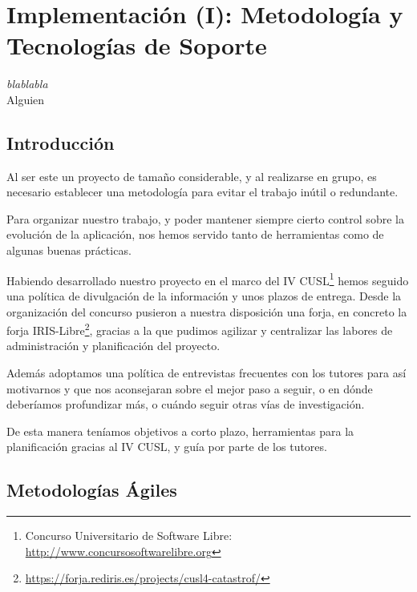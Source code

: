 \chapter*{Implementación (I): Metodología y Tecnologías de Soporte}
\label{cap5a}

\begin{flushright}
\begin{minipage}{7.85cm}
    {\em blablabla} \\  Alguien %
\end{minipage}
\end{flushright}

\vspace*{5mm}

\section*{Introducción}

Al ser este un proyecto de tamaño considerable, y al realizarse en grupo, es
necesario establecer una metodología para evitar el trabajo inútil o redundante.

Para organizar nuestro trabajo, y poder mantener siempre cierto control sobre la
evolución de la aplicación, nos hemos servido tanto de herramientas como de
algunas buenas prácticas.

Habiendo desarrollado nuestro proyecto en el marco del IV CUSL\footnote{Concurso
Universitario de Software Libre: \url{http://www.concursosoftwarelibre.org}}
hemos seguido una política de divulgación de la información y unos plazos de
entrega. Desde la organización del concurso pusieron a nuestra disposición una
forja, en concreto la forja
IRIS-Libre\footnote{\url{https://forja.rediris.es/projects/cusl4-catastrof/}},
gracias a la que pudimos agilizar y centralizar las labores de administración y
planificación del proyecto.

Además adoptamos una política de entrevistas frecuentes con los tutores para
así motivarnos y que nos aconsejaran sobre el mejor paso a seguir, o en dónde
deberíamos profundizar más, o cuándo seguir otras vías de investigación.

De esta manera teníamos objetivos a corto plazo, herramientas para la
planificación gracias al IV CUSL, y guía por parte de los tutores.

\section*{Metodologías Ágiles}

